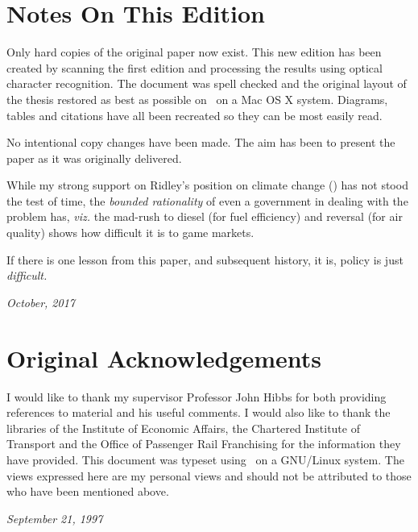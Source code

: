 \thispagestyle{plain}
\section{Notes On This Edition}

Only hard copies of the original paper now exist. This new edition has been created by scanning the first edition and processing the results using optical character recognition. The document was spell checked and the original layout of the thesis restored as best as possible on \XeLaTeX \ on a Mac OS X system. Diagrams, tables and citations have all been recreated so they can be most easily read.

No intentional copy changes have been made. The aim has been to present the paper as it was originally delivered.

While my strong support on Ridley's position on climate change (\cite{Ridley:1996}) has not stood the test of time, the \textit{bounded rationality} of even a government in dealing with the problem has, \textit{viz.} the mad-rush to diesel (for fuel efficiency) and reversal (for air quality) shows how difficult it is to game markets. 

If there is one lesson from this paper, and subsequent history, it is, policy is just \textit{difficult.}

\textit{October, 2017}

\section{Original Acknowledgements}

I would like to thank my supervisor Professor John Hibbs for both providing references to material and his useful comments. I would also like to thank the libraries of the Institute of Economic Affairs, the Chartered Institute of Transport and the Office of Passenger Rail Franchising for the information they have provided. This document was typeset using \LaTeXe  \ on a GNU/Linux system. The views expressed here are my personal views and should not be attributed to those who have been mentioned above.

\textit{September 21, 1997}